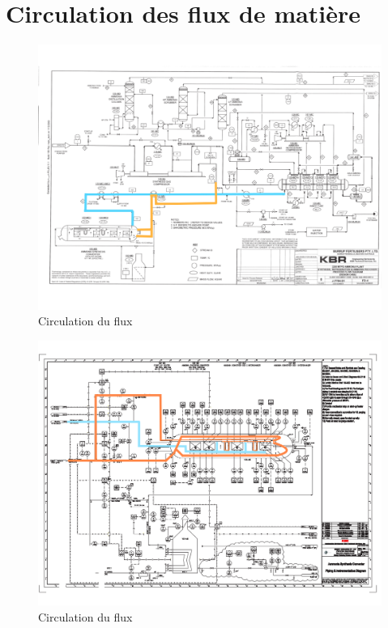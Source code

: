 \documentclass[a4paper,12pt, oneside]{article}
\begin{document}
\section{Circulation des flux de matière}
\begin{figure}
	\includegraphics[scale=0.6]{Plan1.png}
	\caption{Circulation du flux}
	\label{cir1}
	
\end{figure}
\begin{figure}
	\includegraphics[scale=0.5]{Plan2.png}
	\caption{Circulation du flux}
	\label{cir2}
\end{figure}
\end{document}
